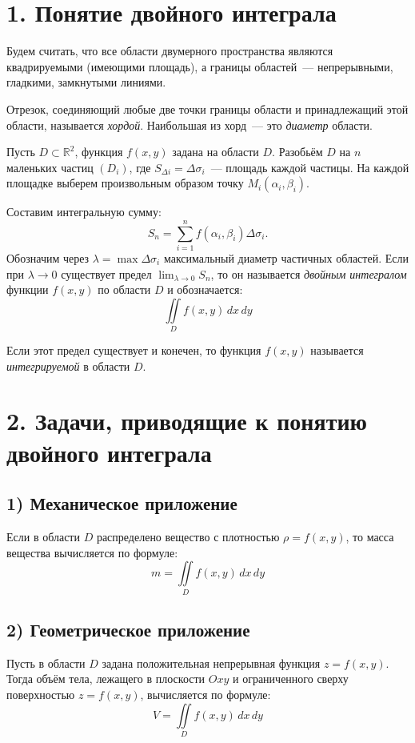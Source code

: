\documentclass[17pt,a4paper]{extreport}
\begin{document}
\tableofcontents
\newpage

\section{1. Понятие двойного интеграла}

Будем считать, что все области двумерного пространства являются квадрируемыми (имеющими площадь), а границы областей~--- непрерывными, гладкими, замкнутыми линиями. 

Отрезок, соединяющий любые две точки границы области и принадлежащий этой области, называется \emph{хордой}. Наибольшая из хорд~--- это \emph{диаметр} области.

Пусть $D \subset \mathbb{R}^2$, функция $f(x,y)$ задана на области $D$. Разобьём $D$ на $n$ маленьких частиц $(D_i)$, где $S_{\Delta i} = \Delta \sigma_i$~--- площадь каждой частицы. На каждой площадке выберем произвольным образом точку $M_i (\alpha_i, \beta_i)$.

Составим интегральную сумму:
\[
S_n = \sum_{i=1}^{n} f(\alpha_i, \beta_i) \Delta \sigma_i.
\]
Обозначим через $\lambda = \max \Delta \sigma_i$ максимальный диаметр частичных областей. Если при $\lambda \to 0$ существует предел $\lim_{\lambda \to 0} S_n$, то он называется \emph{двойным интегралом} функции $f(x, y)$ по области $D$ и обозначается:
\[
\iint\limits_D f(x,y)\,dx\,dy
\]

Если этот предел существует и конечен, то функция $f(x,y)$ называется \emph{интегрируемой} в области $D$.

\newpage

\section{2. Задачи, приводящие к понятию двойного интеграла}

\subsection{1) Механическое приложение}

Если в области $D$ распределено вещество с плотностью $\rho = f(x,y)$, то масса вещества вычисляется по формуле:
\[
m = \iint\limits_D f(x,y)\,dx\,dy
\]

\subsection{2) Геометрическое приложение}

Пусть в области $D$ задана положительная непрерывная функция $z = f(x,y)$. Тогда объём тела, лежащего в плоскости $Oxy$ и ограниченного сверху поверхностью $z = f(x,y)$, вычисляется по формуле:
\[
V = \iint\limits_D f(x,y)\,dx\,dy
\]
\end{document}
